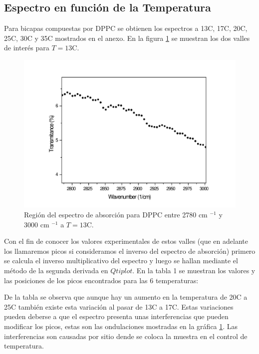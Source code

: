 \documentclass[%
 reprint,
 amsmath,amssymb,
 aps,
]{revtex4-1}
\begin{document}
\subsection{Espectro en función de la Temperatura}
Para bicapas compuestas por DPPC se obtienen los espectros a 13\textdegree C, 17\textdegree C, 20\textdegree C, 25\textdegree C, 30\textdegree C y 35\textdegree C mostrados en el anexo. En la figura \ref{fig:espa13} se muestran los dos valles de interés para $T=13$\textdegree C.
\begin{figure}[h]
\includegraphics[scale=0.3]{FTIR/13C.pdf}
  \caption{Región del espectro de absorción para DPPC entre 2780 cm $^{-1}$ y 3000 cm $^{-1}$ a $T=13$\textdegree C.}
  \label{fig:espa13}
\end{figure}
Con el fin de conocer los valores experimentales de estos valles (que en adelante los llamaremos picos si consideramos el inverso del espectro de absorción) primero se calcula el inverso multiplicativo del espectro y luego se hallan mediante el método de la segunda derivada en $Qtiplot$. En la tabla 1 se muestran los valores y las posiciones de los picos encontrados para las 6 temperaturas:

De la tabla se observa que aunque hay un aumento en la temperatura de 20\textdegree C a 25\textdegree C también existe esta variación al pasar de 13\textdegree C a 17\textdegree C. Estas variaciones pueden deberse a  que el espectro presenta unas interferencias que pueden modificar los picos, estas son las ondulaciones mostradas en la gráfica \ref{fig:espa13}. Las interferencias son causadas por sitio dende se coloca la muestra en el control de temperatura.
\end{document}
